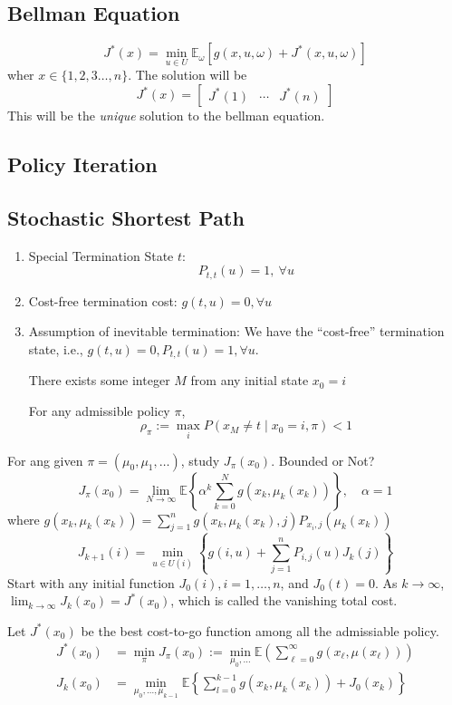 \subsection{Bellman Equation}
\[
J^*(x) = \min_{u\in U}\mathbb{E}_\omega[g(x,u,\omega)+J^*(x,u,\omega)]
\]
wher $x\in\{1,2,3\dots,n\}$.
The solution will be
\[
J^*(x) = \begin{bmatrix}
J^*(1)&\cdots&J^*(n)
\end{bmatrix}
\]
This will be the \emph{unique} solution to the bellman equation.

\subsection{Policy Iteration}



\subsection{Stochastic Shortest Path}
\begin{enumerate}
\item
Special Termination State $t$:
\[
P_{t,t}(u)=1,\ \forall u
\]
\item
Cost-free termination cost: $g(t,u)=0,\forall u$
\item
Assumption of inevitable termination:
We have the ``cost-free'' termination state, i.e., $g(t,u)=0, P_{t,t}(u)=1,\forall u$.

There exists some integer $M$ from any initial state $x_0=i$

For any admissible policy $\pi$,
\[
\rho_{\pi}:=\max_{i}P(x_M\ne t\mid x_0=i,\pi)<1
\]
\end{enumerate}

For ang given $\pi =(\mu_0,\mu_1,\dots)$, study $J_{\pi}(x_0)$. Bounded or Not?
\[
J_{\pi}(x_0)
=\lim_{N\to\infty}
\mathbb{E}
\left\{\alpha^k
\sum_{k=0}^Ng(x_k,\mu_k(x_k))
\right\},\quad
\alpha = 1
\]
where $g(x_k,\mu_k(x_k)) = \sum_{j=1}^ng(x_k,\mu_k(x_k),j)P_{x_i,j}(\mu_k(x_k))$
\[
J_{k+1}(i)
=
\min_{u\in U(i)}
\left\{
g(i,u)+\sum_{j=1}^nP_{i,j}(u)J_k(j)
\right\}
\]
Start with any initial function $J_0(i), i=1,\dots,n$, and $J_0(t)=0$.
As $k\to\infty$, $\lim_{k\to\infty}J_k(x_0) = J^*(x_0)$,
which is called the vanishing total cost.

\begin{definition}
Let $J^*(x_0)$ be the best cost-to-go function among all the admissiable policy.
\begin{align*}
J^*(x_0)&=\min_{\pi}J_{\pi}(x_0)
:=
\min_{\mu_0,\dots}\mathbb{E}\left(
\sum_{\ell=0}^\infty g(x_\ell,\mu(x_{\ell}))
\right)
\\
J_k(x_0)&=\min_{\mu_0,\dots,\mu_{k-1}}
\mathbb{E}
\left\{
\sum_{l=0}^{k-1}g(x_k,\mu_k(x_k))+J_0(x_k)
\right\}
\end{align*}
\end{definition}


